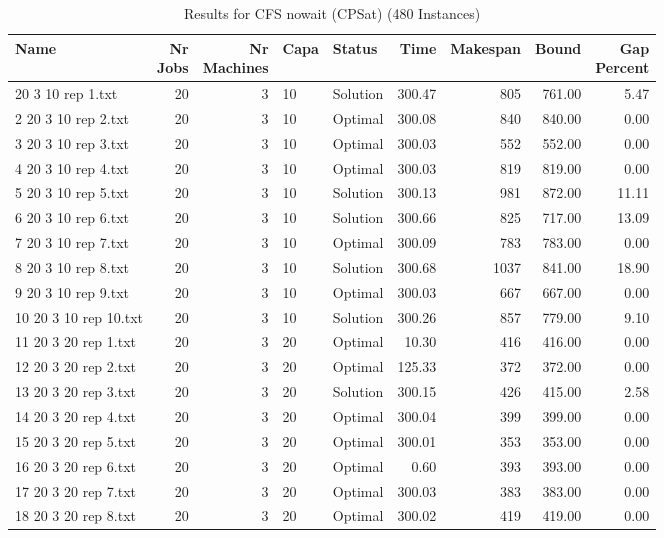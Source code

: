 \begin{longtable}{lrrllrrrr}
\caption{Results for CFS nowait (CPSat) (480 Instances)}\\\toprule
Name & \shortstack{Nr\\Jobs} & \shortstack{Nr\\Machines} & Capa & Status  & Time & Makespan & Bound & \shortstack{Gap\\Percent}\\ \midrule
\endhead
\bottomrule
\endfoot
1 20 3 10 rep 1.txt & 20 & 3 & 10 & Solution & 300.47 & 805 & 761.00 &  5.47\\
2 20 3 10 rep 2.txt & 20 & 3 & 10 & Optimal & 300.08 & 840 & 840.00 &  0.00\\
3 20 3 10 rep 3.txt & 20 & 3 & 10 & Optimal & 300.03 & 552 & 552.00 &  0.00\\
4 20 3 10 rep 4.txt & 20 & 3 & 10 & Optimal & 300.03 & 819 & 819.00 &  0.00\\
5 20 3 10 rep 5.txt & 20 & 3 & 10 & Solution & 300.13 & 981 & 872.00 & 11.11\\
6 20 3 10 rep 6.txt & 20 & 3 & 10 & Solution & 300.66 & 825 & 717.00 & 13.09\\
7 20 3 10 rep 7.txt & 20 & 3 & 10 & Optimal & 300.09 & 783 & 783.00 &  0.00\\
8 20 3 10 rep 8.txt & 20 & 3 & 10 & Solution & 300.68 & 1037 & 841.00 & 18.90\\
9 20 3 10 rep 9.txt & 20 & 3 & 10 & Optimal & 300.03 & 667 & 667.00 &  0.00\\
10 20 3 10 rep 10.txt & 20 & 3 & 10 & Solution & 300.26 & 857 & 779.00 &  9.10\\
11 20 3 20 rep 1.txt & 20 & 3 & 20 & Optimal & 10.30 & 416 & 416.00 &  0.00\\
12 20 3 20 rep 2.txt & 20 & 3 & 20 & Optimal & 125.33 & 372 & 372.00 &  0.00\\
13 20 3 20 rep 3.txt & 20 & 3 & 20 & Solution & 300.15 & 426 & 415.00 &  2.58\\
14 20 3 20 rep 4.txt & 20 & 3 & 20 & Optimal & 300.04 & 399 & 399.00 &  0.00\\
15 20 3 20 rep 5.txt & 20 & 3 & 20 & Optimal & 300.01 & 353 & 353.00 &  0.00\\
16 20 3 20 rep 6.txt & 20 & 3 & 20 & Optimal &  0.60 & 393 & 393.00 &  0.00\\
17 20 3 20 rep 7.txt & 20 & 3 & 20 & Optimal & 300.03 & 383 & 383.00 &  0.00\\
18 20 3 20 rep 8.txt & 20 & 3 & 20 & Optimal & 300.02 & 419 & 419.00 &  0.00\\

\end{longtable}
